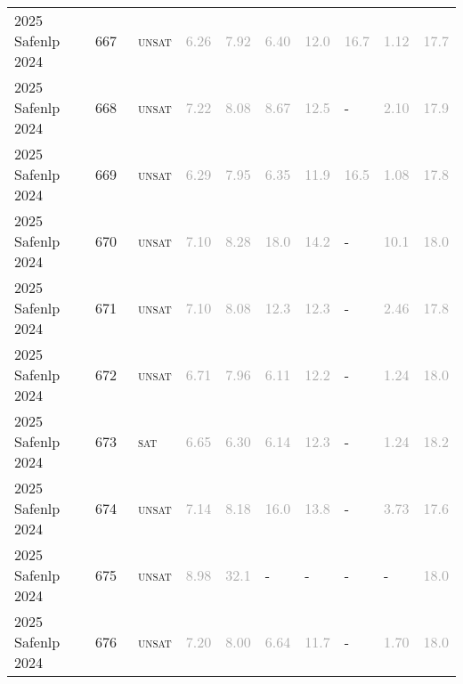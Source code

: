 \begin{center}
{\begin{longtable}{@{}llllllllll@{}}
2025 Safenlp 2024 & 667 & ~\textsc{unsat} & \textcolor{darkgray}{6.26} & \textcolor{darkgray}{7.92} & \textcolor{darkgray}{6.40} & \textcolor{darkgray}{12.0} & \textcolor{darkgray}{16.7} & \textcolor{darkgray}{1.12} & \textcolor{darkgray}{17.7} \\
2025 Safenlp 2024 & 668 & ~\textsc{unsat} & \textcolor{darkgray}{7.22} & \textcolor{darkgray}{8.08} & \textcolor{darkgray}{8.67} & \textcolor{darkgray}{12.5} & - & \textcolor{darkgray}{2.10} & \textcolor{darkgray}{17.9} \\
2025 Safenlp 2024 & 669 & ~\textsc{unsat} & \textcolor{darkgray}{6.29} & \textcolor{darkgray}{7.95} & \textcolor{darkgray}{6.35} & \textcolor{darkgray}{11.9} & \textcolor{darkgray}{16.5} & \textcolor{darkgray}{1.08} & \textcolor{darkgray}{17.8} \\
2025 Safenlp 2024 & 670 & ~\textsc{unsat} & \textcolor{darkgray}{7.10} & \textcolor{darkgray}{8.28} & \textcolor{darkgray}{18.0} & \textcolor{darkgray}{14.2} & - & \textcolor{darkgray}{10.1} & \textcolor{darkgray}{18.0} \\
2025 Safenlp 2024 & 671 & ~\textsc{unsat} & \textcolor{darkgray}{7.10} & \textcolor{darkgray}{8.08} & \textcolor{darkgray}{12.3} & \textcolor{darkgray}{12.3} & - & \textcolor{darkgray}{2.46} & \textcolor{darkgray}{17.8} \\
2025 Safenlp 2024 & 672 & ~\textsc{unsat} & \textcolor{darkgray}{6.71} & \textcolor{darkgray}{7.96} & \textcolor{darkgray}{6.11} & \textcolor{darkgray}{12.2} & - & \textcolor{darkgray}{1.24} & \textcolor{darkgray}{18.0} \\
2025 Safenlp 2024 & 673 & ~\textsc{sat} & \textcolor{darkgray}{6.65} & \textcolor{darkgray}{6.30} & \textcolor{darkgray}{6.14} & \textcolor{darkgray}{12.3} & - & \textcolor{darkgray}{1.24} & \textcolor{darkgray}{18.2} \\
2025 Safenlp 2024 & 674 & ~\textsc{unsat} & \textcolor{darkgray}{7.14} & \textcolor{darkgray}{8.18} & \textcolor{darkgray}{16.0} & \textcolor{darkgray}{13.8} & - & \textcolor{darkgray}{3.73} & \textcolor{darkgray}{17.6} \\
2025 Safenlp 2024 & 675 & ~\textsc{unsat} & \textcolor{darkgray}{8.98} & \textcolor{darkgray}{32.1} & - & - & - & - & \textcolor{darkgray}{18.0} \\
2025 Safenlp 2024 & 676 & ~\textsc{unsat} & \textcolor{darkgray}{7.20} & \textcolor{darkgray}{8.00} & \textcolor{darkgray}{6.64} & \textcolor{darkgray}{11.7} & - & \textcolor{darkgray}{1.70} & \textcolor{darkgray}{18.0} \\

\end{longtable}}
\end{center}
